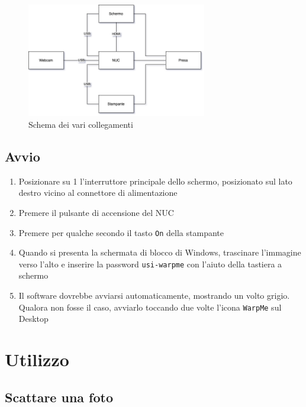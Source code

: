 \documentclass[12pt]{article}
\begin{document}
		\begin{figure}[H]
                \centering
                \includegraphics[width=0.7\textwidth]{img/cables_it.png}
                \caption{Schema dei vari collegamenti}
                \label{cables}
        \end{figure}
		
		
	\subsection{Avvio}
	
	\begin{enumerate}		
		\item Posizionare su 1 l'interruttore principale dello schermo, posizionato sul lato destro vicino al connettore di alimentazione
		\item Premere il pulsante di accensione del NUC
		\item Premere per qualche secondo il tasto \texttt{On} della stampante
		\item Quando si presenta la schermata di blocco di Windows, trascinare l'immagine verso l'alto e inserire la password \texttt{usi-warpme} con l'aiuto della tastiera a schermo
		\item Il software dovrebbe avviarsi automaticamente, mostrando un volto grigio. Qualora non fosse il caso, avviarlo toccando due volte l'icona \texttt{WarpMe} sul Desktop
	\end{enumerate}	
		
		
		
\section{Utilizzo}

	\subsection{Scattare una foto}
\end{document}
